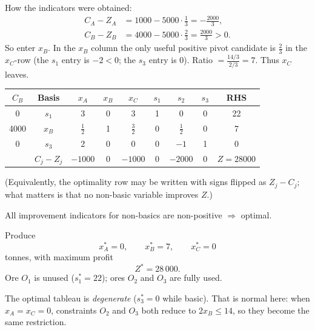 How the indicators were obtained:
\begin{align*}
  C_A-Z_A &= 1000 - 5000\cdot\tfrac13 = -\tfrac{2000}{3},\\
  C_B-Z_B &= 4000 - 5000\cdot\tfrac23 = \tfrac{2000}{3}>0.
\end{align*}
So enter \(x_B\). In the \(x_B\) column the only useful positive pivot candidate is
\(\frac{2}{3}\) in the \(x_C\)-row (the \(s_1\) entry is \(-2<0\); the \(s_3\) entry is \(0\)).
Ratio \(=\frac{14/3}{2/3}=7\). Thus \(x_C\) leaves.

\begin{center}
\renewcommand{\arraystretch}{1.2}
\begin{tabular}{c|c|ccc|ccc|c}
\toprule
\(C_B\) & Basis & \(x_A\) & \(x_B\) & \(x_C\) & \(s_1\) & \(s_2\) & \(s_3\) & RHS \\
\midrule
0 & \(s_1\) & 3 & 0 & 3 & 1 & 0 & 0 & 22 \\
4000 & \(x_B\) & \(\tfrac12\) & 1 & \(\tfrac32\) & 0 & \(\tfrac12\) & 0 & 7 \\
0 & \(s_3\) & 2 & 0 & 0 & 0 & \(-1\) & 1 & 0 \\
\midrule
 & \(C_j-Z_j\) & \(-1000\) & 0 & \(-1000\) & 0 & \(-2000\) & 0 & \(Z=28000\) \\
\bottomrule
\end{tabular}
\end{center}

(Equivalently, the optimality row may be written with signs flipped as \(Z_j-C_j\); what
matters is that no non-basic variable improves \(Z\).)

All improvement indicators for non-basics are non-positive \(\Rightarrow\) optimal.

\begin{resultbox}[title={Part (a)}]
Produce
\[
  x_A^*=0,\qquad x_B^*=7,\qquad x_C^*=0
\]
tonnes, with maximum profit
\[
  Z^*=28\,000.
\]
Ore \(O_1\) is unused (\(s_1^*=22\)); ores \(O_2\) and \(O_3\) are fully used.
\end{resultbox}

\begin{warningbox}
The optimal tableau is \emph{degenerate} (\(s_3^*=0\) while basic). That is normal here:
when \(x_A=x_C=0\), constraints \(O_2\) and \(O_3\) both reduce to \(2x_B\le 14\), so they
become the same restriction.
\end{warningbox}


